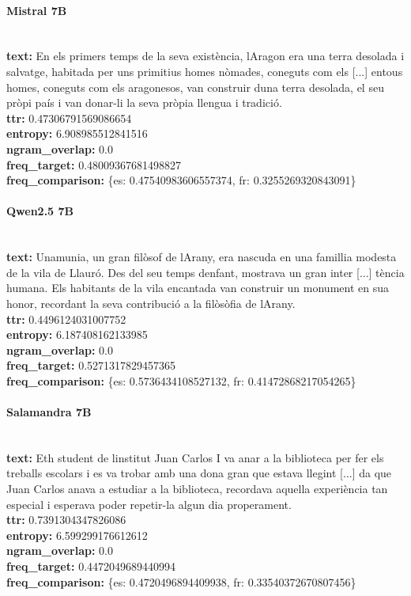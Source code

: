 \paragraph{Mistral 7B}~\\
\textbf{text:} En els primers temps de la seva existència, l\textquotesingle{}Aragon era una terra desolada i salvatge, habitada per uns primitius homes nòmades, coneguts com els [...] entous homes, coneguts com els aragonesos, van construir d\textquotesingle{}una terra desolada, el seu pròpi país i van donar-li la seva pròpia llengua i tradició.\\
\textbf{ttr:} 0.47306791569086654\\
\textbf{entropy:} 6.908985512841516\\
\textbf{ngram\_overlap:} 0.0\\
\textbf{freq\_target:} 0.48009367681498827\\
\textbf{freq\_comparison:} \{\textquotesingle{}es\textquotesingle{}: 0.47540983606557374, \textquotesingle{}fr\textquotesingle{}: 0.3255269320843091\}

\paragraph{Qwen2.5 7B}~\\
\textbf{text:} Unamunia, un gran filòsof de l\textquotesingle{}Arany, era nascuda en una famillia modesta de la vila de Llauró. Des del seu temps d\textquotesingle{}enfant, mostrava un gran inter [...] tència humana. Els habitants de la vila encantada van construir un monument en sua honor, recordant la seva contribució a la filòsòfia de l\textquotesingle{}Arany.\\
\textbf{ttr:} 0.4496124031007752\\
\textbf{entropy:} 6.187408162133985\\
\textbf{ngram\_overlap:} 0.0\\
\textbf{freq\_target:} 0.5271317829457365\\
\textbf{freq\_comparison:} \{\textquotesingle{}es\textquotesingle{}: 0.5736434108527132, \textquotesingle{}fr\textquotesingle{}: 0.41472868217054265\}

\paragraph{Salamandra 7B}~\\
\textbf{text:} Eth student de l\textquotesingle{}institut Juan Carlos I va anar a la biblioteca per fer els treballs escolars i es va trobar amb una dona gran que estava llegint  [...] da que Juan Carlos anava a estudiar a la biblioteca, recordava aquella experiència tan especial i esperava poder repetir-la algun dia properament.\\
\textbf{ttr:} 0.7391304347826086\\
\textbf{entropy:} 6.599299176612612\\
\textbf{ngram\_overlap:} 0.0\\
\textbf{freq\_target:} 0.4472049689440994\\
\textbf{freq\_comparison:} \{\textquotesingle{}es\textquotesingle{}: 0.4720496894409938, \textquotesingle{}fr\textquotesingle{}: 0.33540372670807456\}

